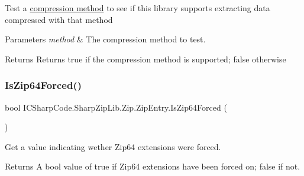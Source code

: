 Test a \hyperlink{class_i_c_sharp_code_1_1_sharp_zip_lib_1_1_zip_1_1_zip_entry_a1c4996433278e904adf2b5a6fe8718c0}{compression method} to see if this library supports extracting data compressed with that method 


\begin{DoxyParams}{Parameters}
{\em method} & The compression method to test.\\
\hline
\end{DoxyParams}
\begin{DoxyReturn}{Returns}
Returns true if the compression method is supported; false otherwise
\end{DoxyReturn}
\mbox{\label{class_i_c_sharp_code_1_1_sharp_zip_lib_1_1_zip_1_1_zip_entry_a1dac769cb20f363a6d1c53c0dade36d9}} 
\subsubsection{\texorpdfstring{Is\+Zip64\+Forced()}{IsZip64Forced()}\hspace{0.1cm}{\footnotesize\ttfamily [1/2]}}
{\footnotesize\ttfamily bool I\+C\+Sharp\+Code.\+Sharp\+Zip\+Lib.\+Zip.\+Zip\+Entry.\+Is\+Zip64\+Forced (\begin{DoxyParamCaption}{ }\end{DoxyParamCaption})\hspace{0.3cm}{\ttfamily [inline]}}



Get a value indicating wether Zip64 extensions were forced. 

\begin{DoxyReturn}{Returns}
A bool value of true if Zip64 extensions have been forced on; false if not.
\end{DoxyReturn}
\mbox{\label{class_i_c_sharp_code_1_1_sharp_zip_lib_1_1_zip_1_1_zip_entry_a1dac769cb20f363a6d1c53c0dade36d9}} 
